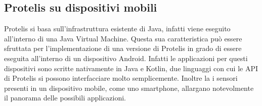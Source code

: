 \subsection{Protelis su dispositivi mobili}
Protelis si basa sull'infrastruttura esistente di Java, infatti viene eseguito
all'interno di una Java Virtual Machine. Questa sua caratteristica può essere
sfruttata per l'implementazione di una versione di Protelis in grado di essere
eseguita all'interno di un dispositivo Android. Infatti le applicazioni per
questi dispositivi sono scritte nativamente in Java e Kotlin, due linguaggi con
cui le API di Protelis si possono interfacciare molto semplicemente. Inoltre la
i sensori presenti in un dispositivo mobile, come uno
smartphone, allargano notevolmente il panorama delle possibili applicazioni.
%

